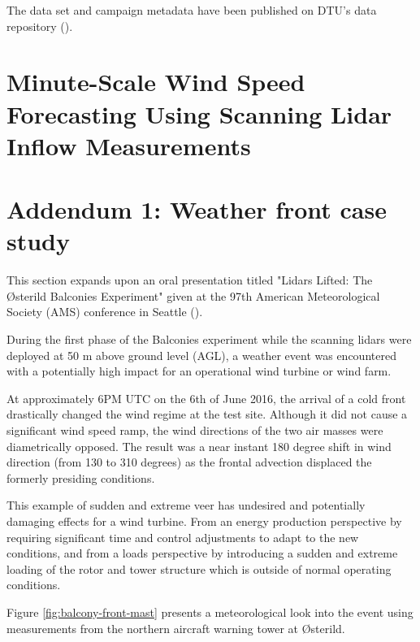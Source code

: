 \noindent
The data set and campaign metadata have been published on DTU's data repository (\cite{balcony_dataset}).

\clearpage
\section{Minute-Scale Wind Speed Forecasting Using Scanning Lidar Inflow Measurements}
\label{sec:balcony_paper}



\clearpage
\section{Addendum 1: Weather front case study}
\label{sec:balcony_addendum1}

This section expands upon an oral presentation titled "Lidars Lifted: The {\O}sterild Balconies Experiment" given at the 97th American Meteorological Society (AMS) conference in Seattle (\cite{simon_lidars_lifted_2017}).

During the first phase of the Balconies experiment while the scanning lidars were deployed at 50 m above ground level (AGL),
a weather event was encountered with a potentially high impact for an operational wind turbine or wind farm.

At approximately 6PM UTC on the 6th of June 2016, the arrival of a cold front drastically changed the wind regime at the test site. Although it did not cause a significant wind speed ramp, the wind directions of the two air masses were diametrically opposed. The result was a near instant 180 degree shift in wind direction (from 130 to 310 degrees) as the frontal advection displaced the formerly presiding conditions. 

This example of sudden and extreme veer has undesired and potentially damaging effects for a wind turbine. From an energy production perspective by requiring significant time and control adjustments to adapt to the new conditions, and from a loads perspective by introducing a sudden and extreme loading of the rotor and tower structure which is outside of normal operating conditions.

Figure \ref{fig:balcony-front-mast} presents a meteorological look into the event using measurements from the northern aircraft warning tower at {\O}sterild.

